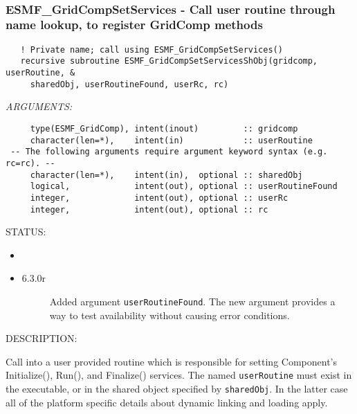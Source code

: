    
 
\mbox{}\hrulefill\ 
 
\subsubsection [ESMF\_GridCompSetServices] {ESMF\_GridCompSetServices - Call user routine through name lookup, to register GridComp methods}


  
\begin{verbatim}   ! Private name; call using ESMF_GridCompSetServices()
   recursive subroutine ESMF_GridCompSetServicesShObj(gridcomp, userRoutine, &
     sharedObj, userRoutineFound, userRc, rc)\end{verbatim}{\em ARGUMENTS:}
\begin{verbatim}     type(ESMF_GridComp), intent(inout)         :: gridcomp
     character(len=*),    intent(in)            :: userRoutine
 -- The following arguments require argument keyword syntax (e.g. rc=rc). --
     character(len=*),    intent(in),  optional :: sharedObj
     logical,             intent(out), optional :: userRoutineFound
     integer,             intent(out), optional :: userRc
     integer,             intent(out), optional :: rc\end{verbatim}
{\sf STATUS:}
   \begin{itemize}
   \item{}
   \item{}
   \begin{description}
   \item[6.3.0r] Added argument {\tt userRoutineFound}.
                The new argument provides a way to test availability without
                causing error conditions.
   \end{description}
   \end{itemize}
  
{\sf DESCRIPTION:\\ }


   \label{GridComp:SetServicesShObj}
   Call into a user provided routine which is responsible for setting
   Component's Initialize(), Run(), and Finalize() services. The named
   {\tt userRoutine} must exist in the executable, or in the shared object
   specified by {\tt sharedObj}. In the latter case all of the platform
   specific details about dynamic linking and loading apply.
  
